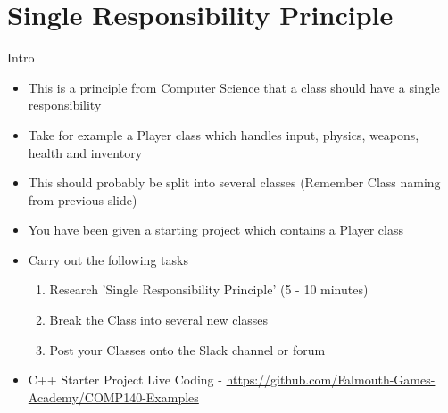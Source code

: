 \part{Single Responsibility Principle}
\frame{\partpage}

\begin{frame}{Intro}
	\begin{itemize}
		\pause \item This is a principle from Computer Science that a class should have a single responsibility
		\pause \item Take for example a Player class which handles input, physics, weapons, health and inventory
		\pause \item This should probably be split into several classes (Remember Class naming from previous slide)
	\end{itemize}
\end{frame}

\begin{frame}
	\begin{itemize}
		\pause \item You have been given a starting project which contains a Player class
		\pause \item Carry out the following tasks
		\begin{enumerate}
			\pause \item Research 'Single Responsibility Principle' (5 - 10 minutes)
			\pause \item Break the Class into several new classes
			\pause \item Post your Classes onto the Slack channel or forum  
		\end{enumerate} 
		\pause \item C++ Starter Project Live Coding - \url{https://github.com/Falmouth-Games-Academy/COMP140-Examples}
	\end{itemize}
\end{frame}